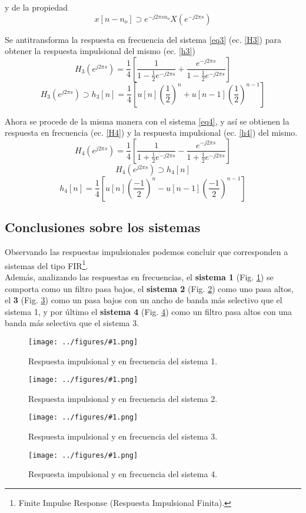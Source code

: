 \documentclass[letterpaper, 10 pt, conference]{ieeeconf}  %
\newcommand{\image}[2] {
  \begin{figure}[H]
    \centering
    \texttt{[image: ../figures/\#1.png]}
    \caption{#2}
    \label{fig:#1}
  \end{figure}
}
\begin{document}
y de la propiedad
\begin{equation*}
  x[n-n_o] \supset e^{-j2{\pi}sn_o}X(e^{-j2{\pi}s})
\end{equation*}

Se antitransforma la respuesta en frecuencia del sistema \ref{eq3} (ec. \ref{H3}) para obtener la respuesta impulsional del mismo (ec. \ref{h3})
\begin{equation*}
  H_3(e^{j2{\pi}s}) = \frac{1}{4}[\frac{1}{1 - \frac{1}{2}e^{-j2{\pi}s}} + \frac{e^{-j2{\pi}s}}{1 - \frac{1}{2}e^{-j2{\pi}s}}]
\end{equation*}
\begin{equation} \label{h3}
  H_3(e^{j2{\pi}s}) \supset h_3[n] = \frac{1}{4} [ u[n](\frac{1}{2})^n + u[n-1](\frac{1}{2})^{n-1} ]
\end{equation}

Ahora se procede de la misma manera con el sistema \ref{eq4}, y as\'i se obtienen la respuesta en frecuencia (ec. \ref{H4}) y la respuesta impulsional (ec. \ref{h4}) del mismo.
\begin{equation} \label{H4}
  H_4(e^{j2{\pi}s}) = \frac{1}{4}[ \frac{1}{1+\frac{1}{2}e^{-j2{\pi}s}} - \frac{e^{-j2{\pi}s}}{1+\frac{1}{2}e^{-j2{\pi}s}} ]
\end{equation}
\begin{equation*}
  H_4(e^{j2{\pi}s}) \supset h_4[n]
\end{equation*}
\begin{equation} \label{h4}
  h_4[n] = \frac{1}{4} [ u[n](\frac{-1}{2})^n - u[n-1](\frac{-1}{2})^{n-1} ]
\end{equation}

\subsection{Conclusiones sobre los sistemas} \label{subsec:conclusiones-sistemas}
Observando las respuestas impulsionales podemos concluir que corresponden a sistemas del tipo FIR\footnote{Finite Impulse Response (Respuesta Impulsional Finita).}. \\
Adem\'as, analizando las respuestas en frecuencias, el \textbf{sistema 1} (Fig. \ref{fig:resp_sist_1}) se comporta como un filtro pasa bajos, el \textbf{sistema 2} (Fig. \ref{fig:resp_sist_2}) como uno pasa altos, el \textbf{3} (Fig. \ref{fig:resp_sist_3}) como un pasa bajos con un ancho de banda m\'as selectivo que el sistema 1, y por \'ultimo el \textbf{sistema 4} (Fig. \ref{fig:resp_sist_4}) como un filtro pasa altos con una banda m\'as selectiva que el sistema 3.
\image{resp_sist_1}{Respuesta impulsional y en frecuencia del sistema 1.}
\image{resp_sist_2}{Respuesta impulsional y en frecuencia del sistema 2.}
\image{resp_sist_3}{Respuesta impulsional y en frecuencia del sistema 3.}
\image{resp_sist_4}{Respuesta impulsional y en frecuencia del sistema 4.}
\end{document}
